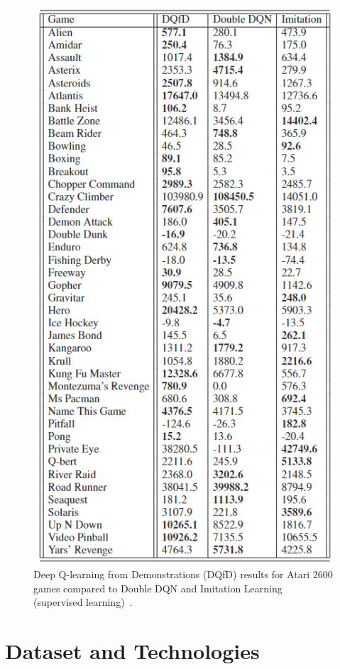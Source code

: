 \documentclass[12pt,american]{report}
\begin{document}
\begin{figure}
\centering
\includegraphics[scale=1]{images/dqfd-results.png}
\caption{Deep Q-learning from Demonstrations (DQfD) results for Atari 2600 games compared to Double DQN and Imitation Learning (supervised learning)~\cite{hester2017learning}.}
\label{fig:dqfd-results}
\end{figure}

\chapter{Dataset and Technologies}
\label{sec:datasetandtech}
\end{document}
